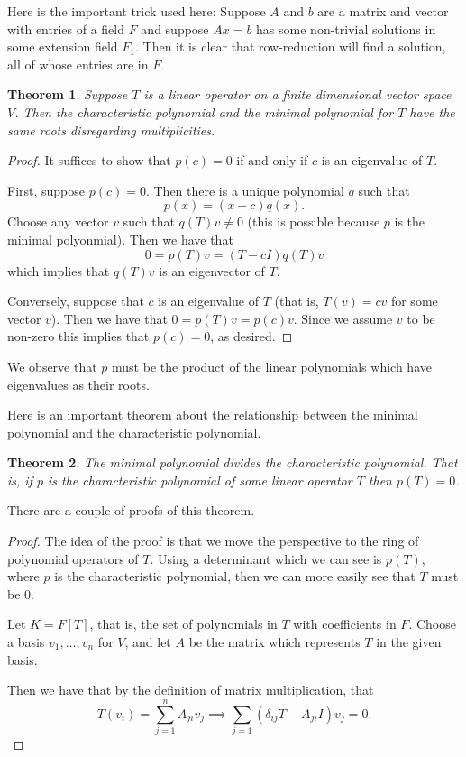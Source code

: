 \documentclass[12pt]{article}
\theoremstyle{plain}
\newtheorem{thm}{Theorem}
\theoremstyle{definition}
\begin{document}
Here is the important trick used here: Suppose $A$ and $b$ are a matrix and vector with entries of a field $F$ and suppose $Ax = b$ has some non-trivial solutions in some extension field $F_1$. Then it is clear that row-reduction will find a solution, all of whose entries are in $F$.

\begin{thm}
Suppose $T$ is a linear operator on a finite dimensional vector space $V$. Then the characteristic polynomial and the minimal polynomial for $T$ have the same roots disregarding multiplicities.
\end{thm}

\begin{proof}
It suffices to show that $p(c) = 0$ if and only if $c$ is an eigenvalue of $T$. 

First, suppose $p(c) = 0$. Then there is a unique polynomial $q$ such that \[p(x) = (x - c)q(x).\] Choose any vector $v$ such that $q(T)v \neq 0$ (this is possible because $p$ is the minimal polyonmial). Then we have that 
\[0 = p(T)v = (T - cI)q(T)v\] which implies that $q(T)v$ is an eigenvector of $T$.

Conversely, suppose that $c$ is an eigenvalue of $T$ (that is, $T(v) = cv$ for some vector $v$). Then we have that $0 = p(T)v = p(c)v$. Since we assume $v$ to be non-zero this implies that $p(c) = 0$, as desired. 
\end{proof}

We observe that $p$ must be the product of the linear polynomials which have eigenvalues as their roots.

Here is an important theorem about the relationship between the minimal polynomial and the characteristic polynomial.

\begin{thm}
The minimal polynomial divides the characteristic polynomial. That is, if $p$ is the characteristic polynomial of some linear operator $T$ then $p(T) = 0$.
\end{thm}

There are a couple of proofs of this theorem.

\begin{proof}
The idea of the proof is that we move the perspective to the ring of polynomial operators of $T$. Using a determinant which we can see is $p(T)$, where $p$ is the characteristic polynomial, then we can more easily see that $T$ must be $0$.

Let $K = F[T]$, that is, the set of polynomials in $T$ with coefficients in $F$. Choose a basis $v_1, \dotsc, v_n$ for $V$, and let $A$ be the matrix which represents $T$ in the given basis.

Then we have that by the definition of matrix multiplication, that 
\[T(v_i) = \sum_{j = 1}^nA_{ji}v_j \implies \sum_{j = 1}(\delta_{ij}T - A_{ji}I)v_j = 0.\]
\end{proof}
\end{document}
